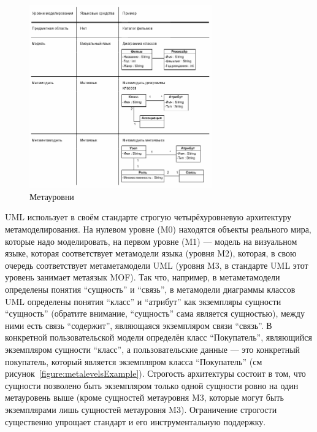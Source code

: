 \documentclass[a5paper]{article}
\begin{document}
\begin{figure}
	\begin{center}
		\includegraphics[width=0.7\textwidth]{metalevels.png}
	\end{center}
	\caption{Метауровни}
	\label{figure:metalevels}
\end{figure}

UML использует в своём стандарте строгую четырёхуровневую архитектуру метамоделирования. На нулевом уровне (M0) находятся объекты реального мира, которые надо моделировать, на первом уровне (M1) --- модель на визуальном языке, которая соответствует метамодели языка (уровня M2), которая, в свою очередь соответствует метаметамодели UML (уровня M3, в стандарте UML этот уровень занимает метаязык MOF). Так что, например, в метаметамодели определены понятия ``сущность'' и ``связь'', в метамодели диаграммы классов UML определены понятия ``класс'' и ``атрибут'' как экземпляры сущности ``сущность'' (обратите внимание, ``сущность'' сама является сущностью), между ними есть связь ``содержит'', являющаяся экземпляром связи ``связь''. В конкретной пользовательской модели определён класс ``Покупатель'', являющийся экземпляром сущности ``класс'', а пользовательские данные --- это конкретный покупатель, который является экземпляром класса ``Покупатель'' (см рисунок~\ref{figure:metalevelsExample}). Строгость архитектуры состоит в том, что сущности позволено быть экземпляром только одной сущности ровно на один метауровень выше (кроме сущностей метауровня M3, которые могут быть экземплярами лишь сущностей метауровня M3). Ограничение строгости существенно упрощает стандарт и его инструментальную поддержку.
\end{document}
